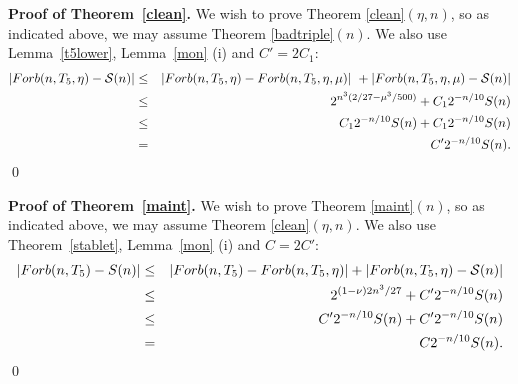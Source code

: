 \documentclass[11pt]{article}
\begin{document}
 {\bf Proof of Theorem~\ref{clean}.}
We wish to prove Theorem \ref{clean}$(\eta, n)$, so as indicated
above, we may assume Theorem \ref{badtriple}$(n)$. We also use
Lemma~\ref{t5lower}, Lemma~\ref{mon} (i) and $C'= 2C_1$:
 \begin{eqnarray*}
 |Forb(n,T_5,\eta)- \mathcal{S}(n)| &\le &
 |Forb(n,T_5,\eta)- Forb(n,T_5,\eta,\mu)|
  \ +
|Forb(n,T_5,\eta,\mu)-\mathcal{S}(n)|\\
& \le & 2^{n^3(2/27-\mu^3/500)} + C_1
2^{-n/10}S(n)\\ & \le & C_1
2^{-n/10}S(n)+C_1
2^{-n/10}S(n)\\
&=&C' 2^{-n/10}S(n).
 \end{eqnarray*}\hfill \qed

 {\bf Proof of Theorem~\ref{maint}.}
We wish to prove Theorem \ref{maint}$(n)$, so as indicated above, we
may assume Theorem \ref{clean}$(\eta, n)$. We also use
Theorem~\ref{stablet}, Lemma~\ref{mon} (i) and $C= 2C'$:
 \begin{eqnarray*}
|Forb(n,T_5)-S(n)|&\le & |Forb(n,T_5)-Forb(n,T_5,\eta)| +
|Forb(n,T_5,\eta)-\mathcal{S}(n)|\\
& \le & \ 2^{(1-\nu){2n^3}/{27}}  + C'
2^{-n/10}S(n)\\
&\le & C'2^{-n/10}S(n)+C'2^{-n/10}S(n) \\
& = & C 2^{-n/10}S(n).\end{eqnarray*}
  \qed
\end{document}
